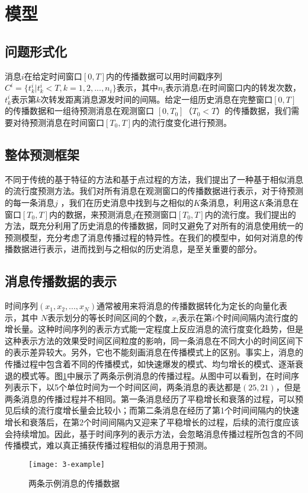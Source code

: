 \section{模型}
\subsection{问题形式化}
消息$i$在给定时间窗口$[0,T]$内的传播数据可以用时间戳序列$C^i=\{t_k^i|t_k^i<T,k=1,2,...,n_i\}$表示，其中$n_i$表示消息$i$在时间窗口内的转发次数，$t_k^i$表示第$k$次转发距离消息源发时间的间隔。给定一组历史消息在完整窗口$[0,T]$的传播数据和一组待预测消息在观测窗口 $[0,T_0]$（$T_0<T$）的传播数据，我们需要对待预测消息在时间窗口$[T_0,T]$内的流行度变化进行预测。

\subsection{整体预测框架}
不同于传统的基于特征的方法和基于点过程的方法，我们提出了一种基于相似消息的流行度预测方法。我们对所有消息在观测窗口的传播数据进行表示，对于待预测的每一条消息$j$ ，我们在历史消息中找到与之相似的$K$条消息，利用这$K$条消息在窗口$[T_0,T]$内的数据，来预测消息$j$在预测窗口$[T_0,T]$内的流行度。我们提出的方法，既充分利用了历史消息的传播数据，同时又避免了对所有的消息使用统一的预测模型，充分考虑了消息传播过程的特异性。在我们的模型中，如何对消息的传播数据进行表示，进而找到与之相似的历史消息，是至关重要的部分。

\subsection{消息传播数据的表示}
时间序列$(x_1,x_2,...,x_N)$通常被用来将消息的传播数据转化为定长的向量化表示，其中 $N$表示划分的等长时间区间的个数，$x_i$表示在第$i$个时间间隔内流行度的增长量。这种时间序列的表示方式能一定程度上反应消息的流行度变化趋势，但是这种表示方法的效果受时间区间粒度的影响，同一条消息在不同大小的时间区间下的表示差异较大。另外，它也不能刻画消息在传播模式上的区别。事实上，消息的传播过程中包含着不同的传播模式，如快速爆发的模式、均匀增长的模式、逐渐衰退的模式等。图\ref{fig:example}中展示了两条示例消息的传播过程。从图中可以看到，在时间序列表示下，以5个单位时间为一个时间区间，两条消息的表达都是$(25,21)$，但是两条消息的传播过程并不相同。第一条消息经历了平稳增长和衰落的过程，可以预见后续的流行度增长量会比较小；而第二条消息在经历了第1个时间间隔内的快速增长和衰落后，在第2个时间间隔内又迎来了平稳增长的过程，后续的流行度应该会持续增加。因此，基于时间序列的表示方法，会忽略消息传播过程所包含的不同传播模式，难以真正捕获传播过程相似的消息用于预测。
\begin{figure}[!htbp]
  \centering
  \texttt{[image: 3-example]}
  \caption{两条示例消息的传播数据}
  \label{fig:example}
\end{figure}

